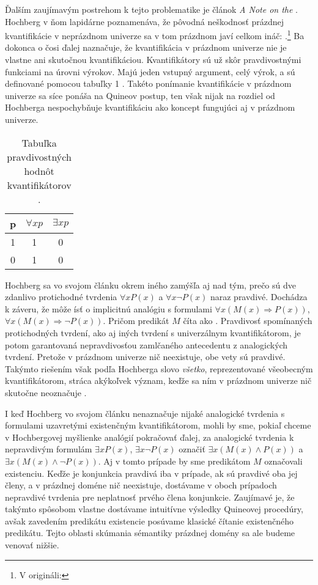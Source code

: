 \documentclass[12pt, letterpaper]{article}
\begin{document}
Ďalším zaujímavým postrehom k tejto problematike je článok \textit{A Note on the }. Hochberg v ňom lapidárne poznamenáva, že pôvodná neškodnosť prázdnej kvantifikácie v neprázdnom univerze sa v tom prázdnom javí celkom ináč: .\footnote{V origináli: } Ba dokonca o čosi ďalej naznačuje, že kvantifikácia v prázdnom univerze nie je vlastne ani skutočnou kvantifikáciou. Kvantifikátory sú už skôr pravdivostnými funkciami na úrovni výrokov. Majú jeden vstupný argument, celý výrok, a sú definované pomocou tabuľky 1 \parencites[545]{hochberg}. Takéto ponímanie kvantifikácie v prázdnom univerze sa síce ponáša na Quineov postup, ten však nijak na rozdiel od Hochberga nespochybňuje kvantifikáciu ako koncept fungujúci aj v prázdnom univerze.
\begin{table}[H]
\begin{center}
\begin{tabular}{ccc}
\toprule
p & $\forall x p$ & $\exists x p$\\
\midrule
 1 & 1 & 0\\
 0 & 1 & 0 \\	
\bottomrule
\end{tabular}
\caption{Tabuľka pravdivostných hodnôt kvantifikátorov \parencites[545]{hochberg}.}
  \end{center}
\label{tab_tvfn}
\end{table}
\noindent Hochberg sa vo svojom článku okrem iného zamýšľa aj nad tým, prečo sú dve zdanlivo protichodné tvrdenia $\forall x P(x)$ a $\forall x \neg P(x)$ naraz pravdivé. Dochádza k záveru, že môže ísť o implicitnú analógiu s formulami $\forall x (M(x) \Rightarrow P(x))$, $\forall x (M(x) \Rightarrow \neg P(x))$. Pričom predikát $M$ číta ako . Pravdivosť spomínaných protichodných tvrdení, ako aj iných tvrdení s univerzálnym kvantifikátorom, je potom garantovaná nepravdivosťou zamlčaného antecedentu z analogických tvrdení. Pretože v prázdnom univerze nič neexistuje, obe vety sú pravdivé. Takýmto riešením však podľa Hochberga slovo \textit{všetko}, reprezentované všeobecným kvantifikátorom, stráca akýkoľvek význam, keďže sa ním v prázdnom univerze nič skutočne neoznačuje \parencites[545--546]{hochberg}.\par 
I keď Hochberg vo svojom článku nenaznačuje nijaké analogické tvrdenia s formulami uzavretými existenčným kvantifikátorom, mohli by sme, pokiaľ chceme v Hochbergovej myšlienke analógií pokračovať ďalej, za analogické tvrdenia k nepravdivým formulám $\exists x P(x)$, $\exists x \neg P(x)$ označiť $\exists x (M(x) \land P(x))$ a $\exists x (M(x) \land \neg P(x))$. Aj v tomto prípade by sme predikátom $M$ označovali existenciu. Keďže je konjunkcia pravdivá iba v prípade, ak sú pravdivé oba jej členy, a v prázdnej doméne nič neexistuje, dostávame v oboch prípadoch nepravdivé tvrdenia pre neplatnosť prvého člena konjunkcie. Zaujímavé je, že takýmto spôsobom vlastne dostávame intuitívne výsledky Quineovej procedúry, avšak zavedením predikátu existencie posúvame klasické čítanie existenčného predikátu. Tejto oblasti skúmania sémantiky prázdnej domény sa ale budeme venovať nižšie.\par
\end{document}
